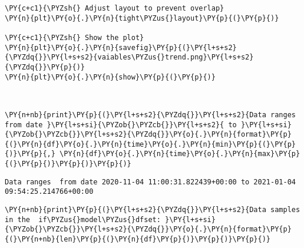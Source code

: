 \begin{tcolorbox}[breakable, size=fbox, boxrule=1pt, pad at break*=1mm,colback=cellbackground, colframe=cellborder]
\begin{Verbatim}[commandchars=\\\{\}]
\PY{c+c1}{\PYZsh{} Adjust layout to prevent overlap}
\PY{n}{plt}\PY{o}{.}\PY{n}{tight\PYZus{}layout}\PY{p}{(}\PY{p}{)}

\PY{c+c1}{\PYZsh{} Show the plot}
\PY{n}{plt}\PY{o}{.}\PY{n}{savefig}\PY{p}{(}\PY{l+s+s2}{\PYZdq{}}\PY{l+s+s2}{vaiables\PYZus{}trend.png}\PY{l+s+s2}{\PYZdq{}}\PY{p}{)}
\PY{n}{plt}\PY{o}{.}\PY{n}{show}\PY{p}{(}\PY{p}{)}
\end{Verbatim}
\end{tcolorbox}

    \begin{center}
    \end{center}
    { \hspace*{\fill} \\}
    
    \begin{tcolorbox}[breakable, size=fbox, boxrule=1pt, pad at break*=1mm,colback=cellbackground, colframe=cellborder]
\begin{Verbatim}[commandchars=\\\{\}]
\PY{n+nb}{print}\PY{p}{(}\PY{l+s+s2}{\PYZdq{}}\PY{l+s+s2}{Data ranges  from date }\PY{l+s+si}{\PYZob{}\PYZcb{}}\PY{l+s+s2}{ to }\PY{l+s+si}{\PYZob{}\PYZcb{}}\PY{l+s+s2}{\PYZdq{}}\PY{o}{.}\PY{n}{format}\PY{p}{(}\PY{n}{df}\PY{o}{.}\PY{n}{time}\PY{o}{.}\PY{n}{min}\PY{p}{(}\PY{p}{)}\PY{p}{,} \PY{n}{df}\PY{o}{.}\PY{n}{time}\PY{o}{.}\PY{n}{max}\PY{p}{(}\PY{p}{)}\PY{p}{)}\PY{p}{)}
\end{Verbatim}
\end{tcolorbox}

    \begin{Verbatim}[commandchars=\\\{\}]
Data ranges  from date 2020-11-04 11:00:31.822439+00:00 to 2021-01-04
09:54:25.214766+00:00
    \end{Verbatim}

    \begin{tcolorbox}[breakable, size=fbox, boxrule=1pt, pad at break*=1mm,colback=cellbackground, colframe=cellborder]
\begin{Verbatim}[commandchars=\\\{\}]
\PY{n+nb}{print}\PY{p}{(}\PY{l+s+s2}{\PYZdq{}}\PY{l+s+s2}{Data samples in the  if\PYZus{}model\PYZus{}dfset: }\PY{l+s+si}{\PYZob{}\PYZcb{}}\PY{l+s+s2}{\PYZdq{}}\PY{o}{.}\PY{n}{format}\PY{p}{(}\PY{n+nb}{len}\PY{p}{(}\PY{n}{df}\PY{p}{)}\PY{p}{)}\PY{p}{)}
\end{Verbatim}
\end{tcolorbox}


